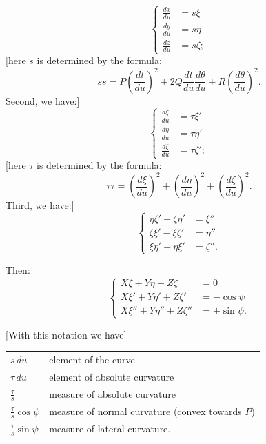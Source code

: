 %
\begin{equation}\tag*{[4]}
\left\{\begin{aligned}
\frac{dx}{du}&=s\xi\\
\frac{dy}{du}&=s\eta\\
\frac{dz}{du}&=s\zeta;
\end{aligned}\right.
\end{equation}
[here $s$ is determined by the formula:
\begin{equation}\tag*{[5]}
ss=P\left(\frac{dt}{du}\right)^2+2Q\frac{dt}{du}\frac{d\theta}{du}+R\left(\frac{d\theta}{du}\right)^2.
\end{equation}
Second, we have:]
\begin{equation}\tag*{[6]}
\left\{\begin{aligned}
\frac{d\xi}{du}&=\tau\xi'\\
\frac{d\eta}{du}&=\tau\eta'\\
\frac{d\zeta}{du}&=\tau\zeta';
\end{aligned}\right.
\end{equation}
[here $\tau$ is determined by the formula:
\begin{equation}\tag*{[7]}
\tau\tau=\left(\frac{d\xi}{du}\right)^2+\left(\frac{d\eta}{du}\right)^2+\left(\frac{d\zeta}{du}\right)^2.
\end{equation}
Third, we have:]
\begin{equation}\tag*{[8]}
\left\{\begin{aligned}
\eta\zeta'-\zeta\eta'&=\xi''\\
\zeta\xi'-\xi\zeta'&=\eta''\\
\xi\eta'-\eta\xi'&=\zeta''.
\end{aligned}\right.
\end{equation}
\par Then:
\begin{equation}\tag*{[9]}
\left\{\begin{aligned}
X\xi+Y\eta+Z\zeta&=0\\
X\xi'+Y\eta'+Z\zeta'&=-\cos\psi\\
X\xi''+Y\eta''+Z\zeta''&=+\sin\psi.
\end{aligned}\right.
\end{equation}

[With this notation we have]
\begin{center}
\begin{tabular}{ll}
$s\,du$&element of the curve\\[3pt]
$\tau\,du$&element of absolute curvature\\[3pt]
$\frac{\tau}{s}$&measure of absolute curvature\\[3pt]
$\frac{\tau}{s}\cos\psi$&measure of normal curvature (convex towards $P$)\\[3pt]
$\frac{\tau}{s}\sin\psi$&measure of lateral curvature.
\end{tabular}
\par\medskip

\end{center}
